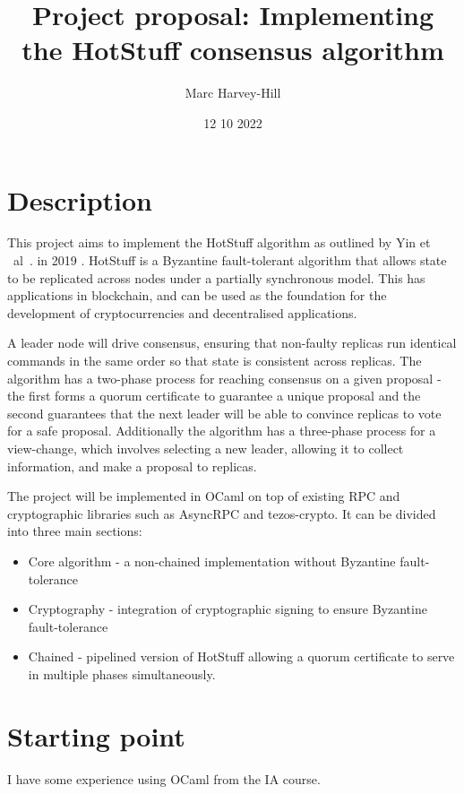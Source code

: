 \documentclass[../main]{subfiles}
\begin{document}
\title{
{Project proposal: Implementing the HotStuff consensus algorithm}
}
\author{Marc Harvey-Hill}
\date{12 10 2022}
\frenchspacing

\maketitle

\section*{Description}
This project aims to implement the HotStuff algorithm as outlined by Yin et ~al~. in 2019 \cite{yinHotStuffBFTConsensus2019}. HotStuff is a Byzantine fault-tolerant algorithm that allows state to be replicated across nodes under a partially synchronous model. This has applications in blockchain, and can be used as the foundation for the development of cryptocurrencies and decentralised applications.

A leader node will drive consensus, ensuring that non-faulty replicas run identical commands in the same order so that state is consistent across replicas. The algorithm has a two-phase process for reaching consensus on a given proposal - the first forms a quorum certificate to guarantee a unique proposal and the second guarantees that the next leader will be able to convince replicas to vote for a safe proposal. Additionally the algorithm has a three-phase process for a view-change, which involves selecting a new leader, allowing it to collect information, and make a proposal to replicas.

The project will be implemented in OCaml on top of existing RPC and cryptographic libraries such as AsyncRPC and tezos-crypto. It can be divided into three main sections:
\begin{itemize}
	\item Core algorithm - a non-chained implementation without Byzantine fault-tolerance
	\item Cryptography - integration of cryptographic signing to ensure Byzantine fault-tolerance
	\item Chained - pipelined version of HotStuff allowing a quorum certificate to serve in multiple phases simultaneously.
\end{itemize}

\section*{Starting point}
I have some experience using OCaml from the IA course.
\end{document}

